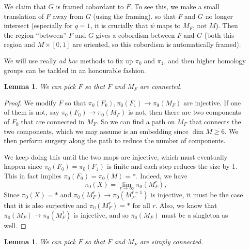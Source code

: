 \documentclass[a4paper, 12pt]{article}
\newtheorem{lemma}[thm]{Lemma}
\theoremstyle{definition}
\begin{document}
We claim that $G$ is framed cobordant to $F$. To see this, we make a small translation of $F$ away from $G$ (using the framing), so that $F$ and $G$ no longer intersect (especially for $q = 1$, it is crucially that $\psi$ maps to $M_F$, not $M$). Then the region ``between'' $F$ and $G$ gives a cobordism between $F$ and $G$ (both this region and $M \times [0, 1]$ are oriented, so this cobordism is automatically framed).

We will use really \emph{ad hoc} methods to fix up $\pi_0$ and $\pi_1$, and then higher homology groups can be tackled in an honourable fashion.
\begin{lemma}
  We can pick $F$ so that $F$ and $M_F$ are connected.
\end{lemma}

\begin{proof}
  We modify $F$ so that $\pi_0(F_0), \pi_0(F_1) \to \pi_0(M_F)$ are injective. If one of them is not, say $\pi_0(F_0) \to \pi_0(M_F)$ is not, then there are two components of $F_0$ that are connected in $M_F$. So we can find a path on $M_F$ that connects the two components, which we may assume is an embedding since $\dim M \geq 6$. We then perform surgery along the path to reduce the number of components.

  We keep doing this until the two maps are injective, which must eventually happen since $\pi_0(F_0) = \pi_0(F_1)$ is finite and each step reduces the size by $1$. This in fact implies $\pi_0(F_0) = \pi_0(M) = *$. Indeed, we have
  \[
    \pi_0(X) = \lim_{r \to \infty} \pi_0(M^r_F),
  \]
  Since $\pi_0(X) = *$ and $\pi_0(M^r_F) \to \pi_0(M^{r + 1}_F)$ is injective, it must be the case that it is also surjective and $\pi_0(M^r_F) = *$ for all $r$. Also, we know that $\pi_0(M_F) \to \pi_0(M^1_F)$ is injective, and so $\pi_0(M_F)$ must be a singleton as well.
\end{proof}

\begin{lemma}
  We can pick $F$ so that $F$ and $M_F$ are simply connected.
\end{lemma}
\end{document}
